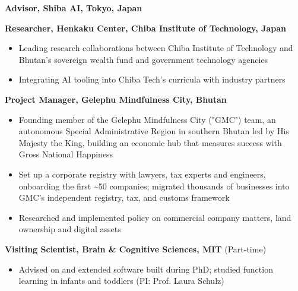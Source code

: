 \documentclass[11pt]{article}
\begin{document}
\vspace{0.25cm}

 \textbf{Advisor, Shiba AI, Tokyo, Japan}

\vspace{0.25cm}

 \textbf{Researcher, Henkaku Center, Chiba Institute of Technology, Japan}
  \vspace{-0.2cm}
\begin{itemize}[itemsep=1pt]
    \item Leading research collaborations between Chiba Institute of Technology and Bhutan's sovereign wealth fund and government technology agencies
    \item Integrating AI tooling into Chiba Tech's curricula with industry partners
\end{itemize}

 \textbf{Project Manager, Gelephu Mindfulness City, Bhutan}
  \vspace{-0.2cm}
\begin{itemize}[itemsep=1pt]
    \item Founding member of the Gelephu Mindfulness City ("GMC") team, an autonomous Special Administrative Region in southern Bhutan led by His Majesty the King, building an economic hub that measures success with Gross National Happiness
    \item Set up a corporate registry with lawyers, tax experts and engineers, onboarding the first \textasciitilde50 companies; migrated thousands of businesses into GMC's independent registry, tax, and customs framework
    \item Researched and implemented policy on commercial company matters, land ownership and digital assets
\end{itemize}

 \textbf{Visiting Scientist, Brain \& Cognitive Sciences, MIT} (Part-time)
  \vspace{-0.2cm}
\begin{itemize}[itemsep=1pt]
    \item Advised on and extended software built during PhD; studied function learning in infants and toddlers (PI: Prof. Laura Schulz)
\end{itemize}
\end{document}
